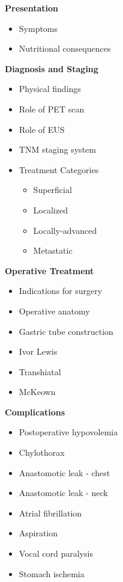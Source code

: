 \documentclass[
  letterpaper,
]{scrbook}
\providecommand{\tightlist}{%
  \setlength{\itemsep}{0pt}\setlength{\parskip}{0pt}}
\begin{document}
\textbf{Presentation}

\begin{itemize}
\tightlist
\item
  Symptoms
\item
  Nutritional consequences
\end{itemize}

\textbf{Diagnosis and Staging}

\begin{itemize}
\tightlist
\item
  Physical findings
\item
  Role of PET scan
\item
  Role of EUS
\item
  TNM staging system
\item
  Treatment Categories

  \begin{itemize}
  \tightlist
  \item
    Superficial
  \item
    Localized
  \item
    Locally-advanced
  \item
    Metastatic
  \end{itemize}
\end{itemize}

\textbf{Operative Treatment}

\begin{itemize}
\tightlist
\item
  Indications for surgery
\item
  Operative anatomy
\item
  Gastric tube construction
\item
  Ivor Lewis
\item
  Transhiatal
\item
  McKeown
\end{itemize}

\textbf{Complications}

\begin{itemize}
\tightlist
\item
  Postoperative hypovolemia
\item
  Chylothorax
\item
  Anastomotic leak - chest
\item
  Anastomotic leak - neck
\item
  Atrial fibrillation
\item
  Aspiration
\item
  Vocal cord paralysis
\item
  Stomach ischemia
\end{itemize}
\end{document}
